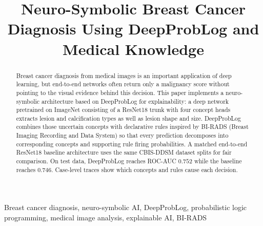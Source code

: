 \documentclass[conference]{IEEEtran}
\begin{document}
\title{Neuro-Symbolic Breast Cancer Diagnosis Using DeepProbLog and Medical Knowledge}



\maketitle

\begin{abstract}
Breast cancer diagnosis from medical images is an important application of deep learning, but end-to-end networks often return only a malignancy score without pointing to the visual evidence behind this decision. This paper implements a neuro-symbolic architecture based on DeepProbLog for explainability: a deep network pretrained on ImageNet consisting of a ResNet18 trunk with four concept heads extracts lesion and calcification types as well as lesion shape and size. DeepProbLog combines those uncertain concepts with declarative rules inspired by BI-RADS (Breast Imaging Recording and Data System) so that every prediction decomposes into corresponding concepts and  supporting rule firing probabilities. A matched end-to-end ResNet18 baseline architecture uses the same CBIS-DDSM dataset splits for fair comparison. On test data, DeepProbLog reaches ROC-AUC $0.752$ while the baseline reaches $0.746$. Case-level traces show which concepts and rules cause each decision.
\end{abstract}

\begin{IEEEkeywords}
Breast cancer diagnosis, neuro-symbolic AI, DeepProbLog, probabilistic logic programming, medical image analysis, explainable AI, BI-RADS
\end{IEEEkeywords}










\end{document}
